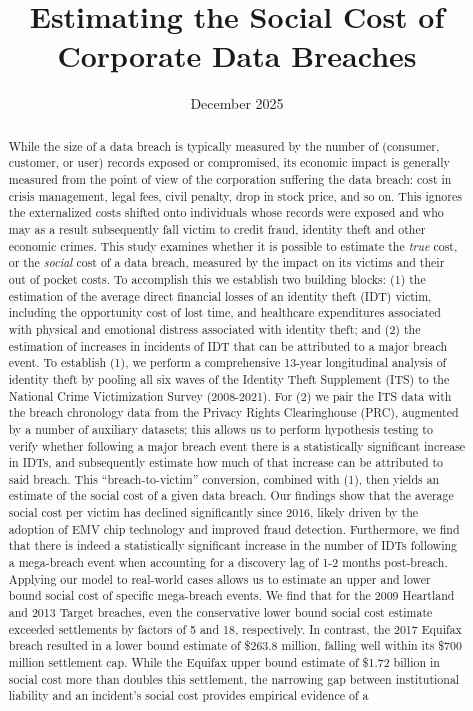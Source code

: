 \documentclass[acmsmall, screen, nonacm]{acmart}
\begin{document}
\title{Estimating the Social Cost of Corporate Data Breaches}


\date{December 2025}



\begin{abstract}
While the size of a data breach is typically measured by the number of (consumer, customer, or user) records exposed or compromised, its economic impact is generally measured from the point of view of the corporation suffering the data breach: cost in crisis management, legal fees, civil penalty, drop in stock price, and so on. This ignores the externalized costs shifted onto individuals whose records were exposed and who may as a result subsequently fall victim to credit fraud, identity theft and other economic crimes.  This study examines whether it is possible to estimate the {\em true} cost, or the {\em social} cost of a data breach, measured by the impact on its victims and their out of pocket costs. To accomplish this we establish two building blocks: (1) the estimation of the average direct financial losses of an identity theft (IDT) victim, including the opportunity cost of lost time, and healthcare expenditures associated with physical and emotional distress associated with identity theft; and (2) the estimation of increases in incidents of IDT that can be attributed to a major breach event. To establish (1), we perform a comprehensive 13-year longitudinal analysis of identity theft by pooling all six waves of the Identity Theft Supplement (ITS) to the National Crime Victimization Survey (2008-2021). For (2) we pair the ITS data with the  breach chronology data from the Privacy Rights Clearinghouse (PRC), augmented by a number of auxiliary datasets; this allows us to perform hypothesis testing to verify whether following a major breach event there is a statistically significant increase in IDTs, and subsequently estimate how much of that increase can be attributed to said breach. This ``breach-to-victim'' conversion, combined with (1), then yields an estimate of the social cost of a given data breach.  Our findings show that the average social cost per victim has declined significantly since 2016, likely driven by the adoption of EMV chip technology and improved fraud detection. Furthermore, we find that there is indeed a statistically significant increase in the number of IDTs following a mega-breach event when accounting for a discovery lag of 1-2 months post-breach. Applying our model to real-world cases allows us to estimate an upper and lower bound social cost of specific mega-breach events. We find that for the 2009 Heartland and 2013 Target breaches, even the conservative lower bound social cost estimate exceeded settlements by factors of 5 and 18, respectively. In contrast, the 2017 Equifax breach resulted in a lower bound estimate of \$263.8 million, falling well within its \$700 million settlement cap. While the Equifax upper bound estimate of \$1.72 billion in social cost more than doubles this settlement, the narrowing gap between institutional liability and an incident's social cost provides empirical evidence of a 
\end{abstract}
\end{document}
